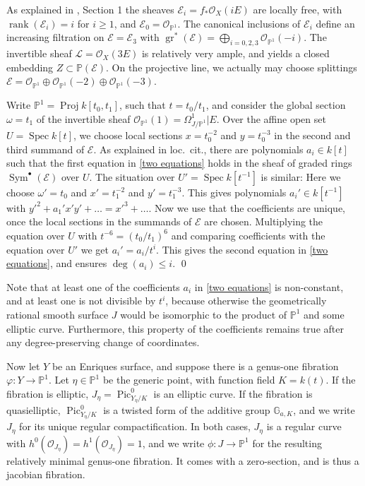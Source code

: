 \documentclass[oneside, 12pt]{amsart}
\theoremstyle{definition}
\theoremstyle{remark}
\newcommand{\PP}{\mathbb{P}}
\newcommand{\GG}{\mathbb{G}}
\newcommand{\shE}{\mathscr{E}}
\newcommand{\shL}{\mathscr{L}}
\newcommand{\gr}{\operatorname{gr}}
\renewcommand{\O}{\mathscr{O}}
\newcommand{\Pic}{\operatorname{Pic}}
\newcommand{\Proj}{\operatorname{Proj}}
\newcommand{\ra}{\rightarrow}
\newcommand{\rank}{\operatorname{rank}}
\newcommand{\Spec}{\operatorname{Spec}}
\newcommand{\Sym}{\operatorname{Sym}}
\begin{document}
As explained in \cite{Deligne 1975}, Section 1 the sheaves $\shE_i=f_*\O_X(iE)$ are locally free,
with $\rank(\shE_i)=i$ for  $i\geq 1$, and $\shE_0=\O_{\PP^1}$. The canonical inclusions of $\shE_i$
define an increasing filtration on $\shE=\shE_3$ with $\gr^*(\shE)=\bigoplus_{i=0,2,3}\O_{\PP^1}(-i)$.
The invertible sheaf $\shL=\O_X(3E)$ is relatively very ample, and yields a closed embedding
$Z\subset\PP(\shE)$.
On the projective line, we actually may choose splittings $\shE=\O_{\PP^1} \oplus\O_{\PP^1}(-2)\oplus\O_{\PP^1}(-3)$.

Write $\PP^1=\Proj k[t_0,t_1]$, such that $t=t_0/t_1$, and consider the global section $\omega=t_1$
of the invertible sheaf
$\O_{\PP^1}(1)=\Omega^1_{J/\PP^1}|E$. Over the affine open set $U=\Spec k[t]$, we choose local sections $x=t_0^{-2}$
and $y=t_0^{-3}$ in the second and third summand of $\shE$. 
As explained in loc.\ cit., there are  polynomials $a_i\in k[t]$ such that 
the first equation in \eqref{two equations} holds in the sheaf of graded rings $\Sym^\bullet(\shE)$ over $U$.
The situation over $U'=\Spec k[t^{-1}]$ is similar: Here we choose $\omega'=t_0$ and $x'=t_1^{-2} $ and $y'=t_1^{-3}$.
This gives polynomials $a_i'\in k[t^{-1}]$ with 
$y'^2+a_1'x'y'+\ldots = x'^3+\ldots$. Now we use that the  coefficients are unique, once the local sections 
in the summands of $\shE$ are chosen.
Multiplying the equation over $U$ with $t^{-6}=(t_0/t_1)^6$ and comparing coefficients with the equation over $U'$
we get $a_i'=a_i/t^i$. This gives the second equation in \eqref{two equations}, and  ensures $\deg(a_i)\leq i$.
\qed

\medskip
Note that at least one of the  coefficients $a_i$ in  \eqref{two equations} is non-constant, and at least one is not divisible by $t^i$,
because otherwise the geometrically rational smooth surface $J$ would be isomorphic to the product of $\PP^1$ and some elliptic curve.
Furthermore, this property of the coefficients remains  true after any degree-preserving change of coordinates.

Now let $Y$ be an Enriques surface, and suppose there is a genus-one fibration $\varphi:Y\ra\PP^1$.
Let $\eta\in\PP^1$ be the generic point, with function field $K=k(t)$. 
If the fibration is elliptic, $J_\eta=\Pic^0_{Y_\eta/K}$ is an elliptic curve.
If the fibration is quasielliptic, $\Pic^0_{Y_\eta/K}$ is a twisted form of the additive group $\GG_{a,K}$,
and we write $J_\eta$ for its unique regular compactification.
In both cases, $J_\eta$ is a regular curve with $h^0(\O_{J_\eta})=h^1(\O_{J_\eta})=1$, and we write
$\phi:J\ra\PP^1$ for the resulting relatively minimal genus-one fibration.
It comes with a zero-section,  and is thus a jacobian fibration.
\end{document}

